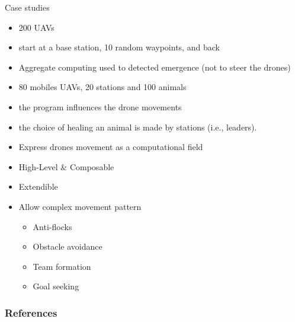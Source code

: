 \documentclass[8pt, aspectratio=169, handout]{beamer}
\begin{document}
\begin{frame}[allowframebreaks]{Case studies}
  \begin{card}
    \begin{multicols}{2}
      \begin{itemize}
        \item 200 UAVs
        \item start at a base station, 10 random waypoints, and back
        \item Aggregate computing used to detected emergence (not to steer the drones)
      \end{itemize}
      \centering
    \end{multicols}
    
    \end{card}
  \begin{card}
    \begin{multicols*}{2}
      \begin{itemize}
        \item 80 mobiles UAVs, 20 stations and 100 animals
        \item the program influences the drone movements 
        \item the choice of healing an animal is made by stations (i.e., leaders).
      \end{itemize}
      \centering
    \end{multicols*}
  \end{card}
  \begin{card}
    \begin{multicols}{2}
      \begin{itemize}
        \item Express drones movement as a computational field
        \item High-Level \& Composable
        \item Extendible
        \item Allow complex movement pattern
        \begin{itemize}
          \item Anti-flocks
          \item Obstacle avoidance
          \item Team formation
          \item Goal seeking
        \end{itemize}
      \end{itemize}
      \centering
    \end{multicols}
  \end{card}
\end{frame}
\begin{frame}[allowframebreaks]
  \frametitle{References}
  \printbibliography
\end{frame}
\end{document}
